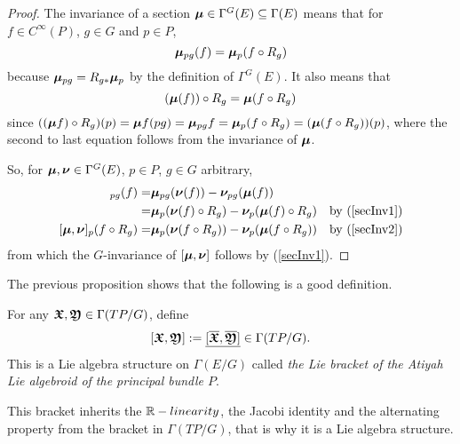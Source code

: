 \begin{proof}
The invariance of a section $\bm{\mu} \in \Gamma^G(E) \subseteq \Gamma(E)$ means that for $f \in C^\infty(P)$, $g \in G$ and $p \in P$,  
\begin{equation} \label{secInv1}
\bm{\mu}_{pg} (f) = \bm{\mu}_p(f \circ R_g)\end{equation} 
because $\bm{\mu}_{pg} = R_{g*} \bm{\mu}_p$ by the definition of $\Gamma^G(E)$. It also means that 
\begin{equation}\label{secInv2}
(\bm{\mu} (f)) \circ R_g = \bm{\mu}(f \circ R_g)
\end{equation}
since $((\bm{\mu} f) \circ R_g)(p) = \bm{\mu} f(pg) = \bm{\mu}_{pg} f = \bm{\mu}_p(f \circ R_g) = (\bm{\mu}(f \circ R_g))(p)$, where the second to last equation follows from the invariance of $\bm{\mu}$.
    
So, for $\bm{\mu}, \bm{\nu} \in \Gamma^G(E)$, $p \in P$, $g \in G$ arbitrary,
\begin{align*}
    [\sect \mu, \sect \nu]_{pg}(f)
        =& \sect \mu_{pg}(\sect \nu(f)) - \sect \nu_{pg}(\sect \mu (f))\\
        =& \sect \mu_{p}(\sect \nu(f) \circ R_g) - \sect \nu_{p}(\sect \mu (f) \circ R_g) & \textrm{by } (\ref{secInv1})\\
    [\sect \mu, \sect \nu]_p (f \circ R_g) =& \sect \mu_p(\sect \nu(f \circ R_g)) - \sect \nu_p(\sect \mu(f \circ R_g)) & \textrm{by } (\ref{secInv2})
\end{align*}
from which the $G$-invariance of $[\bm{\mu}, \bm{\nu}]$ follows by (\ref{secInv1}).
\end{proof}

The previous proposition shows that the following is a good definition.

\begin{definition}\label{AtiyahBracket}
For any $\bm{\mathfrak{X}}, \bm{\mathfrak{Y}} \in \Gamma(TP/G)$, define 
\begin{equation} \label{bracketDefn}
    [\bm{\mathfrak{X}}, \bm{\mathfrak{Y}}] := \underline{[\overline{\bm{\mathfrak{X}}}, \overline{\bm{\mathfrak{Y}}}]} \in \Gamma(TP/G).
\end{equation}
This is a Lie algebra structure on $\Gamma(E/G)$ called \emph{the Lie bracket of the Atiyah Lie algebroid of the principal bundle $P$}.
\end{definition}

This bracket inherits the $\mathbb{R}-linearity$, the Jacobi identity and the alternating property from the bracket in $\Gamma(TP/G)$, that is why it is a Lie algebra structure.


